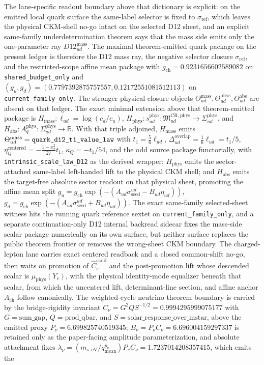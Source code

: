 \begin{itemize}
The lane-specific readout boundary above that dictionary is explicit: on the emitted local quark surface the same-label selector is fixed to \(\sigma_{\mathrm{ref}}\), which leaves the physical CKM-shell no-go intact on the selected D12 sheet, and an explicit same-family underdetermination theorem says that the mass side emits only the one-parameter ray \(D12_{ud}^{\mathrm{mass}}\). The maximal theorem-emitted quark package on the present ledger is therefore the D12 mass ray, the negative selector closure \(\sigma_{\mathrm{ref}}\), and the restricted-scope affine mean package with \(g_{\mathrm{ch}}=0.9231656602589082\) on \texttt{shared\_budget\_only} and \((g_u,g_d)=(0.7797392875757557,0.12172551081512113)\) on \texttt{current\_family\_only}. The stronger physical closure objects \(\Theta_{ud}^{\mathrm{mass}}, \Theta_{ud}^{\mathrm{phys}}, \Theta_{ud}^{\mathrm{abs}}\) are absent on that ledger. The exact minimal extension above that theorem-emitted package is \(H_{\mathrm{mass}}:\ell_{ud}=\log(c_d/c_u)\), \(H_{\mathrm{phys}}:s_{ud}^{\mathrm{phys}}:\mathfrak M_{ud}^{\mathrm{CR,phys}}\to\Sigma_{ud}^{\mathrm{phys}}\), and \(H_{\mathrm{abs}}:A_q^{\mathrm{phys}}:\Sigma_{ud}^{\mathrm{phys}}\to\mathbb R\). With that triple adjoined, \(H_{\mathrm{mass}}\) emits \(\Theta_{ud}^{\mathrm{mass}}=\text{\texttt{quark\_d12\_t1\_value\_law}}\) with \(t_1=\tfrac56\ell_{ud}\), \(\Delta_{ud}^{\mathrm{overlap}}=\tfrac16\ell_{ud}=t_1/5\), \(\eta_Q^{\mathrm{centered}}=-\tfrac{1-x_2^2}{27}t_1\), \(\kappa_Q=-t_1/54\), and the odd source package functorially, with \texttt{intrinsic\_scale\_law\_D12} as the derived wrapper; \(H_{\mathrm{phys}}\) emits the sector-attached same-label left-handed lift to the physical CKM shell; and \(H_{\mathrm{abs}}\) emits the target-free absolute sector readout on that physical sheet, promoting the affine mean split \(g_u=g_{\mathrm{ch}}\exp(-(A_{ud}\sigma_{\mathrm{seed}}^{ud}-B_{ud}\eta_{ud}))\), \(g_d=g_{\mathrm{ch}}\exp(-(A_{ud}\sigma_{\mathrm{seed}}^{ud}+B_{ud}\eta_{ud}))\). The exact same-family selected-sheet witness hits the running quark reference sextet on \texttt{current\_family\_only}, and a separate continuation-only D12 internal backread sidecar fixes the mass-side scalar package numerically on its own surface, but neither surface replaces the public theorem frontier or removes the wrong-sheet CKM boundary. The charged-lepton lane carries exact centered readback and a closed common-shift no-go, then waits on promotion of \(\widehat C_e^{\mathrm{cand}}\) and the post-promotion lift whose descended scalar is \(\mu_{\mathrm{phys}}(Y_e)\), with the physical identity-mode equalizer beneath that scalar, from which the uncentered lift, determinant-line section, and affine anchor \(A_{\mathrm{ch}}\) follow canonically. The weighted-cycle neutrino theorem boundary is carried by the bridge-rigidity invariant \(C_\nu=G^2Q S^{-1/2}=0.9994295999075177\) with \(G=\mathrm{sum\_gap}\), \(Q=\mathrm{prod\_qbar}\), and \(S=\mathrm{solar\_response\_over\_mstar}\), above the emitted proxy \(P_\nu=6.699825740519345\); \(B_\nu=P_\nu C_\nu=6.696004159297337\) is retained only as the paper-facing amplitude parameterization, and absolute attachment fixes \(\lambda_\nu=(m_{\star,\mathrm{eV}}/q_{\mathrm{mean}}^{p_\nu})P_\nu C_\nu=1.7237014208357415\), which emits the 
\end{itemize}
